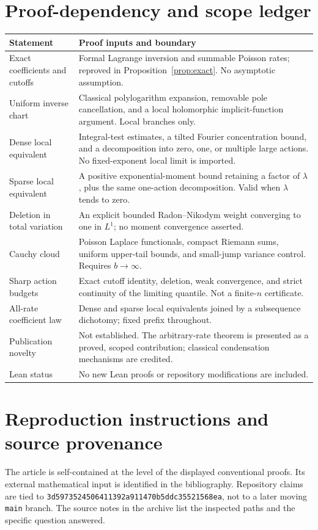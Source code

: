 \documentclass[11pt,a4paper]{article}
\numberwithin{equation}{section}
\theoremstyle{definition}
\theoremstyle{remark}
\newcommand{\commit}{\texttt{3d5973524506411392a911470b5ddc35521568ea}}
\begin{document}
\section{Proof-dependency and scope ledger}
\label{app:ledger}
\begin{longtable}{@{}p{}p{}@{}}
\toprule
Statement & Proof inputs and boundary \\
\midrule\endhead
Exact coefficients and cutoffs & Formal Lagrange inversion and summable
Poisson rates; reproved in Proposition~\ref{prop:exact}. No asymptotic
assumption.\\[5pt]
Uniform inverse chart & Classical polylogarithm expansion, removable pole
cancellation, and a local holomorphic implicit-function argument. Local
branches only.\\[5pt]
Dense local equivalent & Integral-test estimates, a tilted Fourier
concentration bound, and a decomposition into zero, one, or multiple
large actions. No fixed-exponent local limit is imported.\\[5pt]
Sparse local equivalent & A positive exponential-moment bound retaining a
factor of $\lambda$, plus the same one-action decomposition. Valid when
$\lambda$ tends to zero.\\[5pt]
Deletion in total variation & An explicit bounded Radon--Nikodym weight
converging to one in $L^1$; no moment convergence asserted.\\[5pt]
Cauchy cloud & Poisson Laplace functionals, compact Riemann sums, uniform
upper-tail bounds, and small-jump variance control. Requires $b\to\infty$.\\[5pt]
Sharp action budgets & Exact cutoff identity, deletion, weak convergence,
and strict continuity of the limiting quantile. Not a finite-$n$
certificate.\\[5pt]
All-rate coefficient law & Dense and sparse local equivalents joined by a
subsequence dichotomy; fixed prefix throughout.\\[5pt]
Publication novelty & Not established. The arbitrary-rate theorem is
presented as a proved, scoped contribution; classical condensation
mechanisms are credited.\\[5pt]
Lean status & No new Lean proofs or repository modifications are included.\\
\bottomrule
\end{longtable}

\section{Reproduction instructions and source provenance}
The article is self-contained at the level of the displayed conventional
proofs. Its external mathematical input is identified in the bibliography.
Repository claims are tied to \commit, not to a later moving
\texttt{main} branch. The source notes in the archive list the inspected
paths and the specific question answered.
\end{document}
